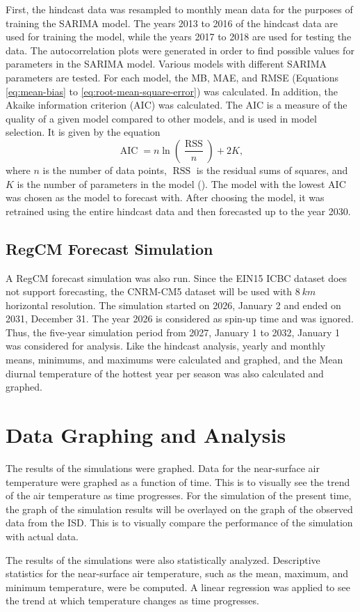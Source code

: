 		First, the hindcast data was resampled to monthly mean data for the purposes of training the SARIMA model.
		The years 2013 to 2016 of the hindcast data are used for training the model, while the years 2017 to 2018 are used for testing the data.
		The autocorrelation plots were generated in order to find possible values for parameters in the SARIMA model.
		Various models with different SARIMA parameters are tested.
		For each model, the MB, MAE, and RMSE (Equations \ref{eq:mean-bias} to \ref{eq:root-mean-square-error}) was calculated.
		In addition, the Akaike information criterion (AIC) was calculated.
		The AIC is a measure of the quality of a given model compared to other models, and is used in model selection.
		It is given by the equation
		\begin{equation}
			\operatorname{AIC} = n \ln \left( 
				\frac{\operatorname{RSS}}{n} 
			\right) + 2K,
			\label{eq:akaike-information-criterion}
		\end{equation}
		where $n$ is the number of data points,
			$\operatorname{RSS}$ is the residual sums of squares,
			and
			$K$ is the number of parameters in the model
			(\cite{Chen2018}).
		The model with the lowest AIC was chosen as the model to forecast with.
		After choosing the model, it was retrained using the entire hindcast data and then forecasted up to the year 2030.
		
	\subsection{RegCM Forecast Simulation}
		A RegCM forecast simulation was also run.
		Since the EIN15 ICBC dataset does not support forecasting,
		the CNRM-CM5 dataset will be used with $\qty{8}{km}$ horizontal resolution.
		The simulation started on 2026, January 2 and ended on 2031, December 31.
		The year 2026 is considered as spin-up time and was ignored.
		Thus, the five-year simulation period from 2027, January 1 to 2032, January 1 was considered for analysis.
		Like the hindcast analysis, yearly and monthly means, minimums, and maximums were calculated and graphed, and the Mean diurnal temperature of the hottest year per season was also calculated and graphed.
		
		
		
	
	
	
	

\section{Data Graphing and Analysis}
	The results of the simulations were graphed.
	Data for the near-surface air temperature were graphed as a function of time.
	This is to visually see the trend of the air temperature as time progresses.
	For the simulation of the present time, the graph of the simulation results will be overlayed on the graph of the observed data from the ISD.
	This is to visually compare the performance of the simulation with actual data.
	
	The results of the simulations were also statistically analyzed.
	Descriptive statistics for the near-surface air temperature, such as the mean, maximum, and minimum temperature, were be computed.
	A linear regression was applied to see the trend at which temperature changes as time progresses.